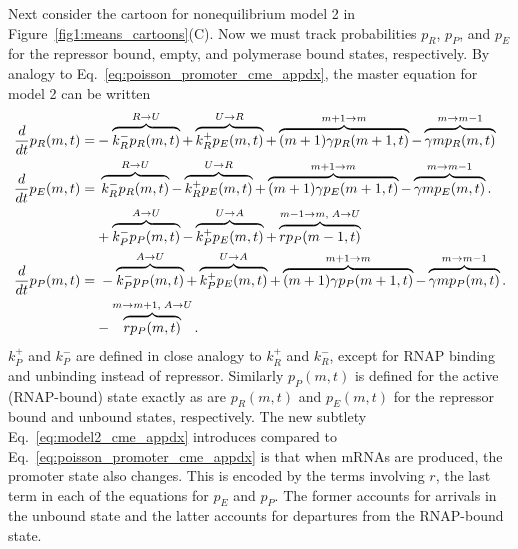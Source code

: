 Next consider the cartoon for nonequilibrium model 2 in
Figure~\ref{fig1:means_cartoons}(C). Now we must track probabilities $p_R$,
$p_P$, and $p_E$ for the repressor bound, empty, and polymerase bound states,
respectively. By analogy to Eq.~\ref{eq:poisson_promoter_cme_appdx}, the master
equation for model 2 can be written
\begin{align}
\begin{split}
\frac{d {}}{d t}p_R(m,t) =& 
- \overbrace{k_R^- p_R(m,t)}^{R \rightarrow U}
+ \overbrace{k_R^+ p_E(m,t)}^{U \rightarrow R}
+ \overbrace{(m+1)\gamma p_R(m+1,t)}^{m + 1 \rightarrow m}
- \overbrace{\gamma mp_R(m,t)}^{m \rightarrow m - 1}
\\
\frac{d {}}{d t}p_E(m,t) =&\; 
  \overbrace{k_R^- p_R(m,t)}^{R \rightarrow U}
- \overbrace{k_R^+ p_E(m,t)}^{U \rightarrow R}
+ \overbrace{(m+1)\gamma p_E(m+1,t)}^{m + 1 \rightarrow m}
- \overbrace{\gamma mp_E(m,t)}^{m \rightarrow m - 1}.
\\
&
+ \overbrace{k_P^- p_P(m,t)}^{A \rightarrow U}
- \overbrace{k_P^+ p_E(m,t)}^{U \rightarrow A}
+ \overbrace{rp_P(m-1,t)}^{m-1 \rightarrow m,\;A \rightarrow U}
\\
\frac{d {}}{d t}p_P(m,t) =&\; 
- \overbrace{k_P^- p_P(m,t)}^{A \rightarrow U}
+ \overbrace{k_P^+ p_E(m,t)}^{U \rightarrow A}
+ \overbrace{(m+1)\gamma p_P(m+1,t)}^{m + 1 \rightarrow m}
- \overbrace{\gamma mp_P(m,t)}^{m \rightarrow m - 1}.
\\
&- \overbrace{rp_P(m,t)}^{m \rightarrow m + 1,\;A \rightarrow U}.
\label{eq:model2_cme_appdx}
\end{split}
\end{align}
$k_P^+$ and $k_P^-$ are defined in close analogy to $k_R^+$ and $k_R^-$, except
for RNAP binding and unbinding instead of repressor. Similarly $p_P(m,t)$ is
defined for the active (RNAP-bound) state exactly as are $p_R(m,t)$ and
$p_E(m,t)$ for the repressor bound and unbound states, respectively. The new
subtlety Eq.~\ref{eq:model2_cme_appdx} introduces compared to
Eq.~\ref{eq:poisson_promoter_cme_appdx} is that when mRNAs are produced, the
promoter state also changes. This is encoded by the terms involving $r$, the
last term in each of the equations for $p_E$ and $p_P$. The former accounts for
arrivals in the unbound state and the latter accounts for departures from the
RNAP-bound state.

